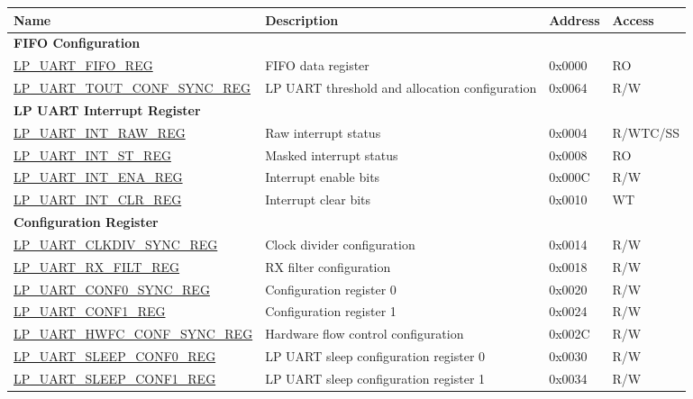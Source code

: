 \begin{longtable}{ | p{6cm} | p{7.2cm} | p{1.3cm} | p{1cm} | }
\hline\rowcolor{lightgray}
Name & Description &  Address & Access \\ \hline
\endhead
\multicolumn{4}{|l|}{\textbf{FIFO Configuration}} \\ \hline
\hyperref[regdesc:LPUARTFIFOREG]{LP\_UART\_FIFO\_REG} & FIFO data register & 0x0000 & RO \\ \hline
\hyperref[regdesc:LPUARTTOUTCONFSYNCREG]{LP\_UART\_TOUT\_CONF\_SYNC\_REG} & LP UART threshold and allocation configuration & 0x0064 & R/W \\ \hline
\multicolumn{4}{|l|}{\textbf{LP UART Interrupt Register}} \\ \hline
\hyperref[regdesc:LPUARTINTRAWREG]{LP\_UART\_INT\_RAW\_REG} & Raw interrupt status & 0x0004 & R/WTC/SS \\ \hline
\hyperref[regdesc:LPUARTINTSTREG]{LP\_UART\_INT\_ST\_REG} & Masked interrupt status & 0x0008 & RO \\ \hline
\hyperref[regdesc:LPUARTINTENAREG]{LP\_UART\_INT\_ENA\_REG} & Interrupt enable bits & 0x000C & R/W \\ \hline
\hyperref[regdesc:LPUARTINTCLRREG]{LP\_UART\_INT\_CLR\_REG} & Interrupt clear bits & 0x0010 & WT \\ \hline
\multicolumn{4}{|l|}{\textbf{Configuration Register}} \\ \hline
\hyperref[regdesc:LPUARTCLKDIVSYNCREG]{LP\_UART\_CLKDIV\_SYNC\_REG} & Clock divider configuration & 0x0014 & R/W \\ \hline
\hyperref[regdesc:LPUARTRXFILTREG]{LP\_UART\_RX\_FILT\_REG} & RX filter configuration & 0x0018 & R/W \\ \hline
\hyperref[regdesc:LPUARTCONF0SYNCREG]{LP\_UART\_CONF0\_SYNC\_REG} & Configuration register 0 & 0x0020 & R/W \\ \hline
\hyperref[regdesc:LPUARTCONF1REG]{LP\_UART\_CONF1\_REG} & Configuration register 1 & 0x0024 & R/W \\ \hline
\hyperref[regdesc:LPUARTHWFCCONFSYNCREG]{LP\_UART\_HWFC\_CONF\_SYNC\_REG} & Hardware flow control configuration & 0x002C & R/W \\ \hline
\hyperref[regdesc:LPUARTSLEEPCONF0REG]{LP\_UART\_SLEEP\_CONF0\_REG} & LP UART sleep configuration register 0 & 0x0030 & R/W \\ \hline
\hyperref[regdesc:LPUARTSLEEPCONF1REG]{LP\_UART\_SLEEP\_CONF1\_REG} & LP UART sleep configuration register 1 & 0x0034 & R/W \\ \hline

\end{longtable}
